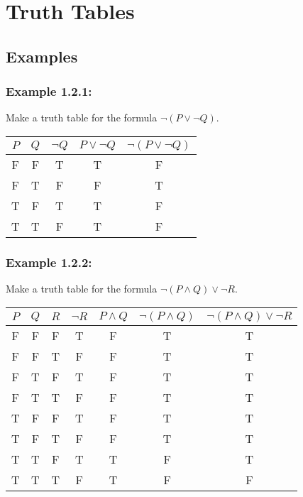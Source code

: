 \documentclass{article} %
\begin{document}
    \newpage

    \section{Truth Tables}
    \subsection*{Examples}

    \subsubsection*{Example 1.2.1:}

    Make a truth table for the formula $\neg (P \vee \neg Q)$.

    \begin{center}
    \begin{tabular}{ c c c c c }
        $P$ & $Q$ & $\neg Q$ & $P \vee \neg Q$ & $\neg (P \vee \neg Q)$ \\ \hline
        F & F & T & T & F \\
        F & T & F & F & T \\
        T & F & T & T & F \\
        T & T & F & T & F
    \end{tabular}
    \end{center}

    \subsubsection*{Example 1.2.2:}

    Make a truth table for the formula $\neg (P \wedge Q) \vee \neg R$.

    \begin{center}
    \begin{tabular}{ c c c c c c c }
        $P$ & $Q$ & $R$ & $\neg R$ & $P \wedge Q$ & $\neg (P \wedge Q)$ & $\neg (P \wedge Q) \vee \neg R$ \\ \hline
        F & F & F & T & F & T & T \\
        F & F & T & F & F & T & T \\
        F & T & F & T & F & T & T \\
        F & T & T & F & F & T & T \\
        T & F & F & T & F & T & T \\
        T & F & T & F & F & T & T \\
        T & T & F & T & T & F & T \\
        T & T & T & F & T & F & F
    \end{tabular}
    \end{center}
\end{document}
